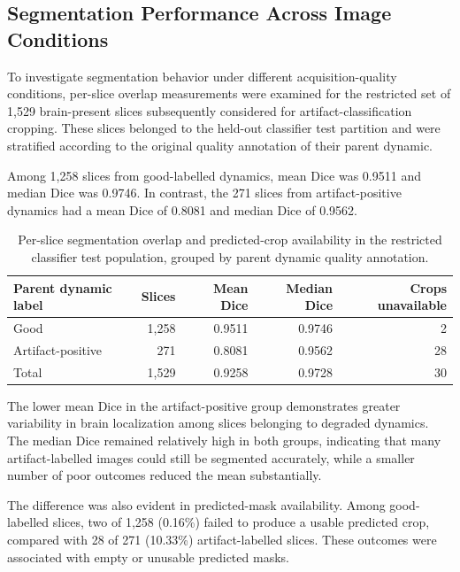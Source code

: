 \subsection{Segmentation Performance Across Image Conditions}
\label{subsec:results_2d_segmentation_subgroups}

To investigate segmentation behavior under different acquisition-quality conditions, per-slice overlap measurements were examined for the restricted set of 1,529 brain-present slices subsequently considered for artifact-classification cropping. These slices belonged to the held-out classifier test partition and were stratified according to the original quality annotation of their parent dynamic.

Among 1,258 slices from good-labelled dynamics, mean Dice was 0.9511 and median Dice was 0.9746. In contrast, the 271 slices from artifact-positive dynamics had a mean Dice of 0.8081 and median Dice of 0.9562.

\begin{table}[htbp]
\centering
\caption{Per-slice segmentation overlap and predicted-crop availability in the restricted classifier test population, grouped by parent dynamic quality annotation.}
\label{tab:2d_segmentation_label_subgroups}
\begin{tabular}{lrrrr}
\hline
Parent dynamic label & Slices & Mean Dice & Median Dice & Crops unavailable \\
\hline
Good & 1,258 & 0.9511 & 0.9746 & 2 \\
Artifact-positive & 271 & 0.8081 & 0.9562 & 28 \\
\hline
Total & 1,529 & 0.9258 & 0.9728 & 30 \\
\hline
\end{tabular}
\end{table}

The lower mean Dice in the artifact-positive group demonstrates greater variability in brain localization among slices belonging to degraded dynamics. The median Dice remained relatively high in both groups, indicating that many artifact-labelled images could still be segmented accurately, while a smaller number of poor outcomes reduced the mean substantially.

The difference was also evident in predicted-mask availability. Among good-labelled slices, two of 1,258 (0.16\%) failed to produce a usable predicted crop, compared with 28 of 271 (10.33\%) artifact-labelled slices. These outcomes were associated with empty or unusable predicted masks.

